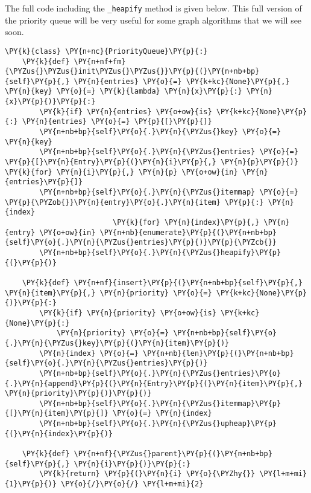 The full code including the \texttt{\_heapify} method is given below.  This full version of the priority queue will be very useful for some graph algorithms that we will see soon.

\begin{Verbatim}[commandchars=\\\{\}]
\PY{k}{class} \PY{n+nc}{PriorityQueue}\PY{p}{:}
    \PY{k}{def} \PY{n+nf+fm}{\PYZus{}\PYZus{}init\PYZus{}\PYZus{}}\PY{p}{(}\PY{n+nb+bp}{self}\PY{p}{,} \PY{n}{entries} \PY{o}{=} \PY{k+kc}{None}\PY{p}{,} \PY{n}{key} \PY{o}{=} \PY{k}{lambda} \PY{n}{x}\PY{p}{:} \PY{n}{x}\PY{p}{)}\PY{p}{:}
        \PY{k}{if} \PY{n}{entries} \PY{o+ow}{is} \PY{k+kc}{None}\PY{p}{:} \PY{n}{entries} \PY{o}{=} \PY{p}{[}\PY{p}{]}
        \PY{n+nb+bp}{self}\PY{o}{.}\PY{n}{\PYZus{}key} \PY{o}{=} \PY{n}{key}
        \PY{n+nb+bp}{self}\PY{o}{.}\PY{n}{\PYZus{}entries} \PY{o}{=} \PY{p}{[}\PY{n}{Entry}\PY{p}{(}\PY{n}{i}\PY{p}{,} \PY{n}{p}\PY{p}{)} \PY{k}{for} \PY{n}{i}\PY{p}{,} \PY{n}{p} \PY{o+ow}{in} \PY{n}{entries}\PY{p}{]}
        \PY{n+nb+bp}{self}\PY{o}{.}\PY{n}{\PYZus{}itemmap} \PY{o}{=} \PY{p}{\PYZob{}}\PY{n}{entry}\PY{o}{.}\PY{n}{item} \PY{p}{:} \PY{n}{index}
                         \PY{k}{for} \PY{n}{index}\PY{p}{,} \PY{n}{entry} \PY{o+ow}{in} \PY{n+nb}{enumerate}\PY{p}{(}\PY{n+nb+bp}{self}\PY{o}{.}\PY{n}{\PYZus{}entries}\PY{p}{)}\PY{p}{\PYZcb{}}
        \PY{n+nb+bp}{self}\PY{o}{.}\PY{n}{\PYZus{}heapify}\PY{p}{(}\PY{p}{)}

    \PY{k}{def} \PY{n+nf}{insert}\PY{p}{(}\PY{n+nb+bp}{self}\PY{p}{,} \PY{n}{item}\PY{p}{,} \PY{n}{priority} \PY{o}{=} \PY{k+kc}{None}\PY{p}{)}\PY{p}{:}
        \PY{k}{if} \PY{n}{priority} \PY{o+ow}{is} \PY{k+kc}{None}\PY{p}{:}
            \PY{n}{priority} \PY{o}{=} \PY{n+nb+bp}{self}\PY{o}{.}\PY{n}{\PYZus{}key}\PY{p}{(}\PY{n}{item}\PY{p}{)}
        \PY{n}{index} \PY{o}{=} \PY{n+nb}{len}\PY{p}{(}\PY{n+nb+bp}{self}\PY{o}{.}\PY{n}{\PYZus{}entries}\PY{p}{)}
        \PY{n+nb+bp}{self}\PY{o}{.}\PY{n}{\PYZus{}entries}\PY{o}{.}\PY{n}{append}\PY{p}{(}\PY{n}{Entry}\PY{p}{(}\PY{n}{item}\PY{p}{,} \PY{n}{priority}\PY{p}{)}\PY{p}{)}
        \PY{n+nb+bp}{self}\PY{o}{.}\PY{n}{\PYZus{}itemmap}\PY{p}{[}\PY{n}{item}\PY{p}{]} \PY{o}{=} \PY{n}{index}
        \PY{n+nb+bp}{self}\PY{o}{.}\PY{n}{\PYZus{}upheap}\PY{p}{(}\PY{n}{index}\PY{p}{)}

    \PY{k}{def} \PY{n+nf}{\PYZus{}parent}\PY{p}{(}\PY{n+nb+bp}{self}\PY{p}{,} \PY{n}{i}\PY{p}{)}\PY{p}{:}
        \PY{k}{return} \PY{p}{(}\PY{n}{i} \PY{o}{\PYZhy{}} \PY{l+m+mi}{1}\PY{p}{)} \PY{o}{/}\PY{o}{/} \PY{l+m+mi}{2}


\end{Verbatim}
